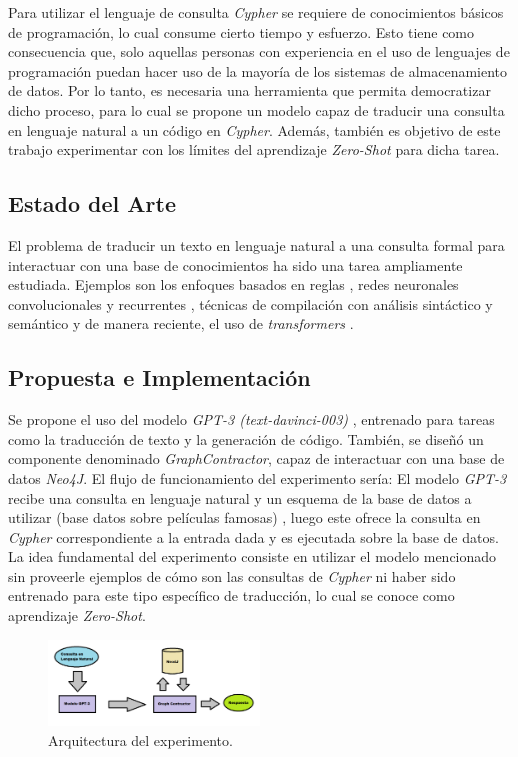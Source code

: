 \documentclass[a4paper,10pt,twocolumn]{article}
\begin{document}
Para utilizar el lenguaje de consulta \textit{Cypher} se requiere de conocimientos básicos de programación, lo cual consume cierto tiempo y esfuerzo. Esto tiene como consecuencia que, solo aquellas personas con experiencia en el uso de lenguajes de programación puedan hacer uso de la mayoría de los sistemas de almacenamiento de datos. Por lo tanto, es necesaria una herramienta que permita democratizar dicho proceso, para lo cual se propone un modelo capaz de traducir una consulta en lenguaje natural a un código en \textit{Cypher}. Además, también es objetivo de este trabajo experimentar con los límites del aprendizaje \textit{Zero-Shot} \cite{zeroshot} para dicha tarea. 

\subsection{Estado del Arte}
El problema de traducir un texto en lenguaje natural a una consulta formal para interactuar con una base de conocimientos ha sido una tarea ampliamente estudiada. Ejemplos son los enfoques basados en reglas \cite{rba1}, redes neuronales convolucionales y recurrentes \cite{rnc} \cite{rnr}, técnicas de compilación con análisis sintáctico y semántico \cite{comp} y de manera reciente, el uso de \textit{transformers} \cite{transformers}. 

\subsection{Propuesta e Implementación}
Se propone el uso del modelo \textit{GPT-3 (text-davinci-003)} \cite{gpt3}, entrenado para tareas como la traducción de texto y la generación de código. También, se diseñó un componente denominado \textit{GraphContractor}, capaz de interactuar con una base de datos \textit{Neo4J}. El flujo de funcionamiento del experimento sería: El modelo \textit{GPT-3} recibe una consulta en lenguaje natural y un esquema \cite{dbschema} de la base de datos a utilizar (base datos sobre películas famosas) \cite{moviesdb}, luego este ofrece la consulta en \textit{Cypher} correspondiente a la entrada dada y es ejecutada sobre la base de datos. La idea fundamental del experimento consiste en utilizar el modelo mencionado sin proveerle ejemplos de cómo son las consultas de \textit{Cypher} ni haber sido entrenado para este tipo específico de traducción, lo cual se conoce como aprendizaje \textit{Zero-Shot}.

\begin{figure}[h!]
\includegraphics[width=0.5\textwidth]{img/architecture.png}
\caption{Arquitectura del experimento.}\label{img:arch}
\end{figure}
\end{document}

